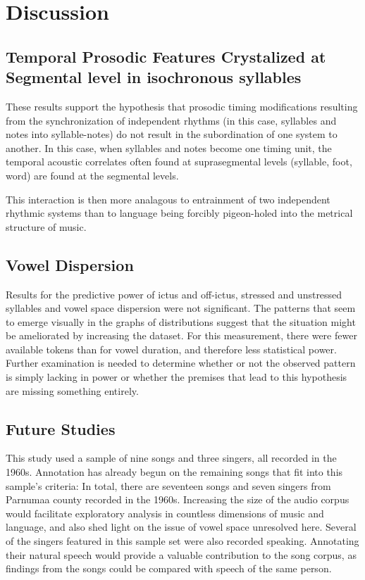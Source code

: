 \chapter{Discussion}
%

\section{Temporal Prosodic Features Crystalized at Segmental level in isochronous syllables}

These results support the hypothesis that prosodic timing modifications resulting from the synchronization of independent rhythms (in this case, syllables and notes into syllable-notes) do not result in the subordination of one system to another. In this case, when syllables and notes become one timing unit, the temporal acoustic correlates often found at suprasegmental levels (syllable, foot, word) are found at the segmental levels. 

This interaction is then more analagous to entrainment of two independent rhythmic systems than to language being forcibly pigeon-holed into the metrical structure of music. 


\section{Vowel Dispersion}
Results for the predictive power of ictus and off-ictus, stressed and unstressed syllables and vowel space dispersion were not significant. The patterns that seem to emerge visually in the graphs of distributions suggest that the situation might be ameliorated by increasing the dataset. For this measurement, there were fewer available tokens than for vowel duration, and therefore less statistical power. Further examination is needed to determine whether or not the observed pattern is simply lacking in power or whether the premises that lead to this hypothesis are missing something entirely. 


\section{Future Studies} 

This study used a sample of nine songs and three singers, all recorded in the 1960s. Annotation has already begun on the remaining songs that fit into this sample's criteria: In total, there are seventeen songs and seven singers from Parnumaa county recorded in the 1960s. Increasing the size of the audio corpus would facilitate exploratory analysis in countless dimensions of music and language, and also shed light on the issue of vowel space unresolved here. 
Several of the singers featured in this sample set were also recorded speaking. Annotating their natural speech would provide a valuable contribution to the song corpus, as findings from the songs could be compared with speech of the same person.  

